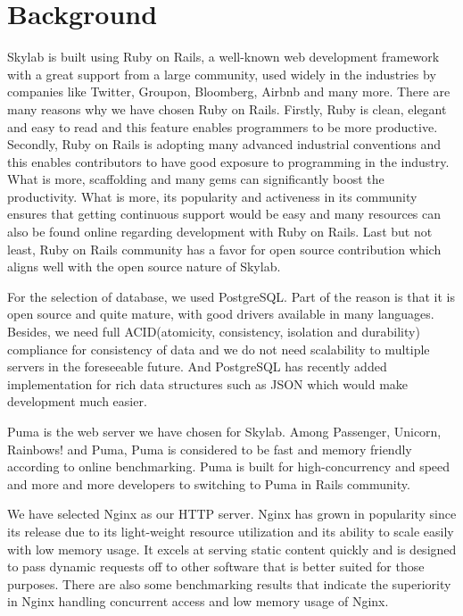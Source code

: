 \chapter{Background} \label{background}

Skylab is built using Ruby on Rails, a well-known web development framework with a great support from a large community, used widely in the industries by companies like Twitter, Groupon, Bloomberg, Airbnb and many more\cite{citation1}. There are many reasons why we have chosen Ruby on Rails. Firstly, Ruby is clean, elegant and easy to read and this feature enables programmers to be more productive. Secondly, Ruby on Rails is adopting many advanced industrial conventions and this enables contributors to have good exposure to programming in the industry. What is more, scaffolding and many gems can significantly boost the productivity. What is more, its popularity and activeness in its community ensures that getting continuous support would be easy and many resources can also be found online regarding development with Ruby on Rails. Last but not least, Ruby on Rails community has a favor for open source contribution which aligns well with the open source nature of Skylab.

For the selection of database, we used PostgreSQL. Part of the reason is that it is open source and quite mature, with good drivers available in many languages\cite{citation2}. Besides, we need full ACID(atomicity, consistency, isolation and durability) compliance for consistency of data and we do not need scalability to multiple servers in the foreseeable future\cite{citationACID}. And PostgreSQL has recently added implementation for rich data structures such as JSON which would make development much easier\cite{citation3}.

Puma is the web server we have chosen for Skylab. Among Passenger, Unicorn, Rainbows! and Puma, Puma is considered to be fast and memory friendly according to online benchmarking\cite{citation4}. Puma is built for high-concurrency and speed and more and more developers to switching to Puma in Rails community\cite{citation5}.

We have selected Nginx as our HTTP server. Nginx has grown in popularity since its release due to its light-weight resource utilization and its ability to scale easily with low memory usage. It excels at serving static content quickly and is designed to pass dynamic requests off to other software that is better suited for those purposes\cite{citation6}. There are also some benchmarking results that indicate the superiority in Nginx handling concurrent access and low memory usage of Nginx\cite{citation7}.

